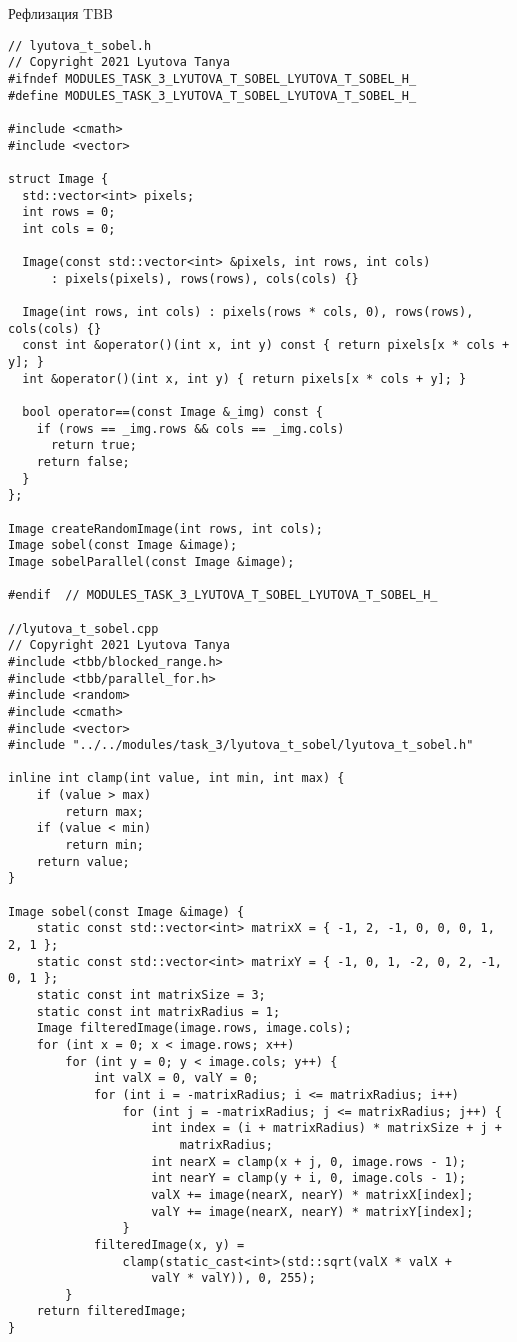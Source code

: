 \documentclass{report}
\begin{document}
\par Рефлизация TBB
\begin{lstlisting}
// lyutova_t_sobel.h
// Copyright 2021 Lyutova Tanya
#ifndef MODULES_TASK_3_LYUTOVA_T_SOBEL_LYUTOVA_T_SOBEL_H_
#define MODULES_TASK_3_LYUTOVA_T_SOBEL_LYUTOVA_T_SOBEL_H_

#include <cmath>
#include <vector>

struct Image {
  std::vector<int> pixels;
  int rows = 0;
  int cols = 0;

  Image(const std::vector<int> &pixels, int rows, int cols)
      : pixels(pixels), rows(rows), cols(cols) {}

  Image(int rows, int cols) : pixels(rows * cols, 0), rows(rows), cols(cols) {}
  const int &operator()(int x, int y) const { return pixels[x * cols + y]; }
  int &operator()(int x, int y) { return pixels[x * cols + y]; }

  bool operator==(const Image &_img) const {
    if (rows == _img.rows && cols == _img.cols)
      return true;
    return false;
  }
};

Image createRandomImage(int rows, int cols);
Image sobel(const Image &image);
Image sobelParallel(const Image &image);

#endif  // MODULES_TASK_3_LYUTOVA_T_SOBEL_LYUTOVA_T_SOBEL_H_

//lyutova_t_sobel.cpp
// Copyright 2021 Lyutova Tanya
#include <tbb/blocked_range.h>
#include <tbb/parallel_for.h>
#include <random>
#include <cmath>
#include <vector>
#include "../../modules/task_3/lyutova_t_sobel/lyutova_t_sobel.h"

inline int clamp(int value, int min, int max) {
    if (value > max)
        return max;
    if (value < min)
        return min;
    return value;
}

Image sobel(const Image &image) {
    static const std::vector<int> matrixX = { -1, 2, -1, 0, 0, 0, 1, 2, 1 };
    static const std::vector<int> matrixY = { -1, 0, 1, -2, 0, 2, -1, 0, 1 };
    static const int matrixSize = 3;
    static const int matrixRadius = 1;
    Image filteredImage(image.rows, image.cols);
    for (int x = 0; x < image.rows; x++)
        for (int y = 0; y < image.cols; y++) {
            int valX = 0, valY = 0;
            for (int i = -matrixRadius; i <= matrixRadius; i++)
                for (int j = -matrixRadius; j <= matrixRadius; j++) {
                    int index = (i + matrixRadius) * matrixSize + j +
                        matrixRadius;
                    int nearX = clamp(x + j, 0, image.rows - 1);
                    int nearY = clamp(y + i, 0, image.cols - 1);
                    valX += image(nearX, nearY) * matrixX[index];
                    valY += image(nearX, nearY) * matrixY[index];
                }
            filteredImage(x, y) =
                clamp(static_cast<int>(std::sqrt(valX * valX +
                    valY * valY)), 0, 255);
        }
    return filteredImage;
}


\end{lstlisting}
\end{document}
